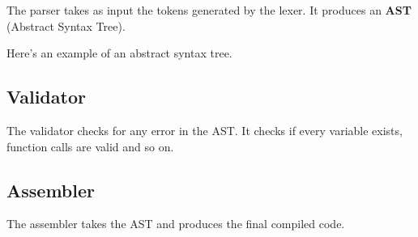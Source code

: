 \documentclass[a4paper]{article}
\begin{document}
The parser takes as input the tokens generated by the lexer.
It produces an \textbf{AST} (Abstract Syntax Tree).

Here's an example of an abstract syntax tree.

\begin{center}
\end{center}

\subsection{Validator}

The validator checks for any error in the AST.
It checks if every variable exists, function calls are valid and so on.

\subsection{Assembler}

The assembler takes the AST and produces the final compiled code.
\end{document}
